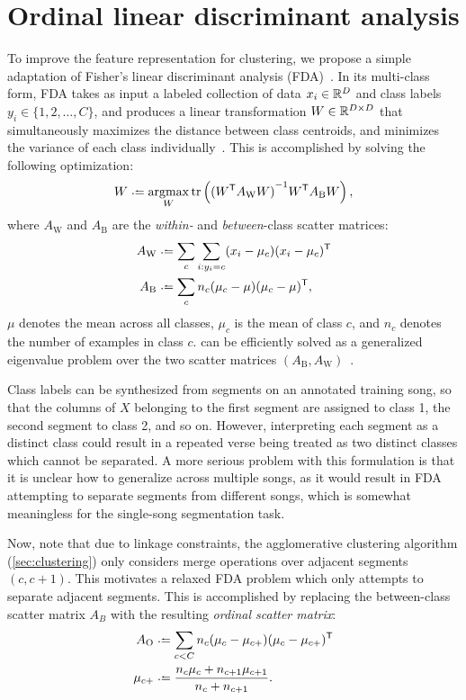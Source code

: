 \documentclass{article}
\begin{document}
\section{Ordinal linear discriminant analysis}
\label{sec:olda}
To improve the feature representation for clustering, we propose a simple adaptation of Fisher's linear discriminant
analysis (FDA)~\cite{fisher1936use}.  In its multi-class form, FDA takes as input a labeled collection of data $x_i \in \mathbb{R}^D$
and class labels $y_i \in \{1,2,\ldots, C\}$, and produces a linear transformation $W \in \mathbb{R}^{D\times D}$ that simultaneously 
maximizes the distance between class centroids, and minimizes the variance of each class 
individually~\cite{fukunaga1990introduction}. This is accomplished by solving the following optimization:
\begin{equation}
W \defeq \argmax_W \trace\left( {(W\trans A_\text{W} W)}^{-1} W\trans A_\text{B} W \right) \label{eq:fda},
\end{equation}
where $A_\text{W}$ and $A_\text{B}$ are the \emph{within-} and \emph{between}-class scatter matrices:
\begin{align*}
A_\text{W} & \defeq \sum_c \sum_{i : y_i = c} (x_i - \mu_c)(x_i - \mu_c)\trans\\
A_\text{B} & \defeq \sum_c n_c (\mu_c - \mu)(\mu_c - \mu)\trans,
\end{align*}
$\mu$ denotes the mean across all classes, $\mu_c$ is the mean of class $c$, and $n_c$ denotes the number of examples in class $c$.
 can be efficiently solved as a generalized eigenvalue problem over the two scatter matrices $(A_\text{B},
A_\text{W})$~\cite{de2005eigenproblems}.

Class labels can be synthesized from segments on an annotated training song, so that the columns of $X$ belonging to the first 
segment are assigned to class 1, the second segment to class 2, and so on.
However, interpreting each segment as a distinct class could result in a repeated verse being treated as two distinct classes which 
cannot be separated. 
A more serious problem with this formulation is that it is unclear how to generalize across multiple songs, as it would result in
FDA attempting to separate segments from different songs, which is somewhat meaningless for the single-song segmentation task.

Now, note that due to linkage constraints, the agglomerative clustering algorithm (\cref{sec:clustering}) only considers merge 
operations over adjacent segments $(c, c+1)$. This motivates a relaxed FDA problem which only attempts to separate adjacent
segments.  This is accomplished by replacing the between-class scatter matrix $A_B$ with the resulting \emph{ordinal scatter matrix}:
\begin{align*}
A_\text{O} &\defeq \sum_{c < C} n_c (\mu_c - \mu_{c+}) (\mu_c - \mu_{c+})\trans\\
\mu_{c+} &\defeq \frac{n_c \mu_c + n_{c+1} \mu_{c+1} }{n_c + n_{c+1}}.
\end{align*}
\end{document}
